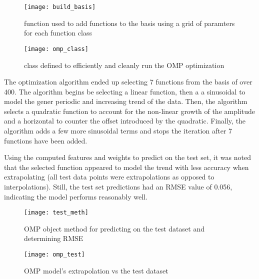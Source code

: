 \begin{figure}[H]
\centering
\texttt{[image: build\_basis]}
\caption{function used to add functions to the basis using a grid of paramters for each function class}
\end{figure}

\begin{figure}[H]
\centering
\texttt{[image: omp\_class]}
\caption{class defined to efficiently and cleanly run the OMP optimization}
\end{figure}

The optimization algorithm ended up selecting 7 functions from the basis of over 400. The algorithm begins be selecting a linear function, then a a sinusoidal to model the gener periodic and increasing trend of the data. Then, the algorithm selects a quadratic function to account for the non-linear growth of the amplitude and a horizontal to counter the offset introduced by the quadratic. Finally, the algorithm adds a few more sinusoidal terms and stops the iteration after 7 functions have been added.

Using the computed features and weights to predict on the test set, it was noted that the selected function appeared to model the trend with less accuracy when extrapolating (all test data points were extrapolations as opposed to interpolations). Still, the test set predictions had an RMSE value of 0.056, indicating the model performs reasonably well.

\begin{figure}[H]
\centering
\texttt{[image: test\_meth]}
\caption{OMP object method for predicting on the test dataset and determining RMSE}
\end{figure}

\begin{figure}[H]
\centering
\texttt{[image: omp\_test]}
\caption{OMP model's extrapolation vs the test dataset}
\end{figure}

